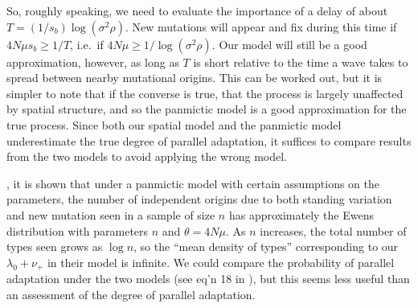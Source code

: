 \documentclass{article}
\begin{document}
So, roughly speaking, we need to evaluate the importance of a delay of about $T = (1/s_b) \log (\sigma^2 \rho)$.
New mutations will appear and fix during this time if $4N\mu s_b \ge 1/T$,
i.e.\ if $4 N \mu \ge 1/\log (\sigma^2 \rho)$.
Our model will still be a good approximation, however, 
as long as $T$ is short relative to the time a wave takes to spread between nearby mutational origins.
This can be worked out,
but it is simpler to note that if the converse is true, 
that the process is largely unaffected by spatial structure,
and so the panmictic model is a good approximation for the true process.
Since both our spatial model and the panmictic model underestimate the true degree of parallel adaptation,
it suffices to compare results from the two models to avoid applying the wrong model.


\citet{softsweepsII}, it is shown that under a panmictic model with certain assumptions on the parameters,
the number of independent origins due to both standing variation and new mutation seen in a sample of size $n$
has approximately the Ewens distribution with parameters $n$ and $\theta = 4 N \mu$.
As $n$ increases, the total number of types seen grows as $\log n$, 
so the ``mean density of types'' corresponding to our $\lambda_0 + \nu_+$ in their model is infinite.
We could compare the probability of parallel adaptation under the two models (see eq'n 18 in \citet{softsweepsII}),
but this seems less useful than an assessment of the degree of parallel adaptation.



\end{document}
